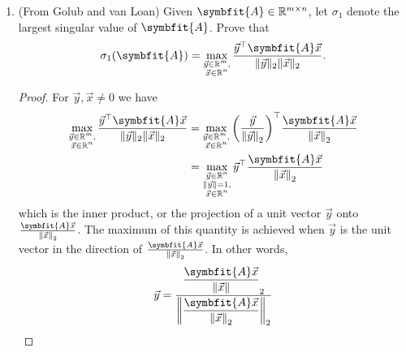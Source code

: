 \documentclass{article}
\theoremstyle{definition}
\newtheorem*{answer}{Answer}
\newcommand{\reals}{\mathbb{R}}
\newcommand{\mat}[1]{\symbfit{#1}}
\begin{document}
\begin{enumerate}[leftmargin=\labelsep]
\begin{enumerate}
\begin{answer}
\begin{align*}
\begin{bmatrix}
					                                                                    0.6  & -0.8 \\
					                                                                    -0.8 & -0.6 \\
				                                                                    \end{bmatrix}^\top,                       \\
				            \|\mat{A} - \mat{A}_1\|_2 & = 3.
			            \end{align*}
		            \end{answer}
	      \end{enumerate}

	\item (From Golub and van Loan) Given \(\mat{A} \in \reals^{m \times n}\), let \(\sigma_1\) denote the largest singular value of \(\mat{A}\). Prove that
	      \[
		      \sigma_1(\mat{A}) = \max_{\substack{\vec{y} \in \reals^m, \\ \vec{x} \in \reals^n}} \frac{\vec{y}^\top \mat{A} \vec{x}}{\|\vec{y}\|_2\|\vec{x}\|_2}.
	      \]
	      \begin{proof}
		      For \(\vec{y},\vec{x}\neq 0\) we have
		      \begin{align}
			      \max_{\substack{\vec{y} \in \reals^m,   \\ \vec{x} \in \reals^n}} \frac{\vec{y}^\top \mat{A} \vec{x}}{\|\vec{y}\|_2\|\vec{x}\|_2} &= \max_{\substack{\vec{y} \in \reals^m, \\ \vec{x} \in \reals^n}} \qty(\frac{\vec{y}}{\norm{\vec{y}}_2})^{\top} \frac{\mat{A}\vec{x}}{\norm{\vec{x}}_2} \nonumber \\
			       & = \max_{\substack{\vec{y}\in\reals^n \\\norm{\vec{y}}=1, \\ \vec{x} \in \reals^n}} \vec{y}^{\top} \frac{\mat{A}\vec{x}}{\norm{\vec{x}}_2} \label{eq:Golubsetup}
		      \end{align}
		      which is the inner product, or the projection of a unit vector \(\vec{y}\) onto \(\frac{\mat{A}\vec{x}}{\norm{\vec{x}}_2}\). The maximum of this quantity is achieved when \(\vec{y}\) is the unit vector in the direction of \(\frac{\mat{A}\vec{x}}{\norm{\vec{x}}_2}\). In other words,
		      \begin{align*}
			      \vec{y} & = \frac{\displaystyle\frac{\mat{A}\vec{x}}{\norm{\vec{x}}}_2}{\norm{\displaystyle\frac{\mat{A}\vec{x}}{\norm{\vec{x}}_2}}_2} \\

\end{align*}
\end{proof}
\end{enumerate}
\end{document}
